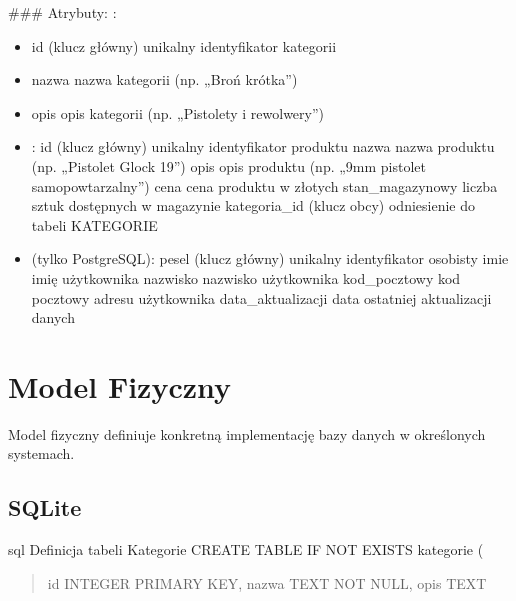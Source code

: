\documentclass[letterpaper,10pt,polish]{sphinxmanual}
\begin{document}
\sphinxAtStartPar
{\color{red}\bfseries{}\textasciigrave{}\textasciigrave{}}{\color{red}\bfseries{}\textasciigrave{}}

\sphinxAtStartPar
\#\#\# Atrybuty:
\sphinxhyphen{} :
\begin{itemize}
\item {} 
\sphinxAtStartPar
id (klucz główny) \sphinxhyphen{} unikalny identyfikator kategorii

\item {} 
\sphinxAtStartPar
nazwa \sphinxhyphen{} nazwa kategorii (np. „Broń krótka”)

\item {} 
\sphinxAtStartPar
opis \sphinxhyphen{} opis kategorii (np. „Pistolety i rewolwery”)

\end{itemize}
\begin{itemize}
\item {} 
\sphinxAtStartPar
{}:
\sphinxhyphen{} id (klucz główny) \sphinxhyphen{} unikalny identyfikator produktu
\sphinxhyphen{} nazwa \sphinxhyphen{} nazwa produktu (np. „Pistolet Glock 19”)
\sphinxhyphen{} opis \sphinxhyphen{} opis produktu (np. „9mm pistolet samopowtarzalny”)
\sphinxhyphen{} cena \sphinxhyphen{} cena produktu w złotych
\sphinxhyphen{} stan\_magazynowy \sphinxhyphen{} liczba sztuk dostępnych w magazynie
\sphinxhyphen{} kategoria\_id (klucz obcy) \sphinxhyphen{} odniesienie do tabeli KATEGORIE

\item {} 
\sphinxAtStartPar
{} (tylko PostgreSQL):
\sphinxhyphen{} pesel (klucz główny) \sphinxhyphen{} unikalny identyfikator osobisty
\sphinxhyphen{} imie \sphinxhyphen{} imię użytkownika
\sphinxhyphen{} nazwisko \sphinxhyphen{} nazwisko użytkownika
\sphinxhyphen{} kod\_pocztowy \sphinxhyphen{} kod pocztowy adresu użytkownika
\sphinxhyphen{} data\_aktualizacji \sphinxhyphen{} data ostatniej aktualizacji danych

\end{itemize}


\section{Model Fizyczny}
\label{\detokenize{rozdzial3/index:model-fizyczny}}
\sphinxAtStartPar
Model fizyczny definiuje konkretną implementację bazy danych w określonych systemach.


\subsection{SQLite}
\label{\detokenize{rozdzial3/index:sqlite}}
\sphinxAtStartPar
{\color{red}\bfseries{}\textasciigrave{}\textasciigrave{}}{\color{red}\bfseries{}\textasciigrave{}}sql
\textendash{} Definicja tabeli Kategorie
CREATE TABLE IF NOT EXISTS kategorie (
\begin{quote}

\sphinxAtStartPar
id INTEGER PRIMARY KEY,
nazwa TEXT NOT NULL,
opis TEXT
\end{quote}
\end{document}

